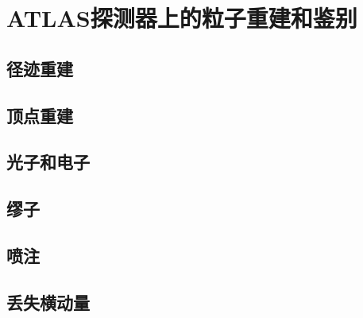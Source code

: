 \chapter{ATLAS探测器上的粒子重建和鉴别}
\label{chap:AtlasRecon}

\section{径迹重建}
\section{顶点重建}
\section{光子和电子}
\section{缪子}
\section{喷注}
\section{丢失横动量}

